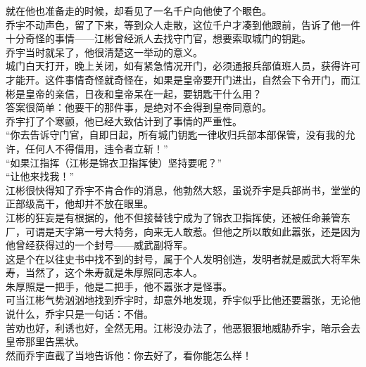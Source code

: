 \begin{multicols}{\theparacolNo}
就在他也准备走的时候，却看见了一名千户向他使了个眼色。\\

乔宇不动声色，留了下来，等到众人走散，这位千户才凑到他跟前，告诉了他一件十分奇怪的事情——江彬曾经派人去找守门官，想要索取城门的钥匙。\\

乔宇当时就呆了，他很清楚这一举动的意义。\\

城门白天打开，晚上关闭，如有紧急情况开门，必须通报兵部值班人员，获得许可才能开。这件事情奇怪就奇怪在，如果是皇帝要开门进出，自然会下令开门，而江彬是皇帝的亲信，日夜和皇帝呆在一起，要钥匙干什么用？\\

答案很简单：他要干的那件事，是绝对不会得到皇帝同意的。\\

乔宇打了个寒颤，他已经大致估计到了事情的严重性。\\

“你去告诉守门官，自即日起，所有城门钥匙一律收归兵部本部保管，没有我的允许，任何人不得借用，违令者立斩！”\\

“如果江指挥（江彬是锦衣卫指挥使）坚持要呢？”\\

“让他来找我！”\\

江彬很快得知了乔宇不肯合作的消息，他勃然大怒，虽说乔宇是兵部尚书，堂堂的正部级高干，他却并不放在眼里。\\

江彬的狂妄是有根据的，他不但接替钱宁成为了锦衣卫指挥使，还被任命兼管东厂，可谓是天字第一号大特务，向来无人敢惹。但他之所以敢如此嚣张，还是因为他曾经获得过的一个封号——威武副将军。\\

这是个在以往史书中找不到的封号，属于个人发明创造，发明者就是威武大将军朱寿，当然了，这个朱寿就是朱厚照同志本人。\\

朱厚照是一把手，他是二把手，他不嚣张才是怪事。\\

可当江彬气势汹汹地找到乔宇时，却意外地发现，乔宇似乎比他还要嚣张，无论他说什么，乔宇只是一句话：不借。\\

苦劝也好，利诱也好，全然无用。江彬没办法了，他恶狠狠地威胁乔宇，暗示会去皇帝那里告黑状。\\

然而乔宇直截了当地告诉他：你去好了，看你能怎么样！\\


\end{multicols}
